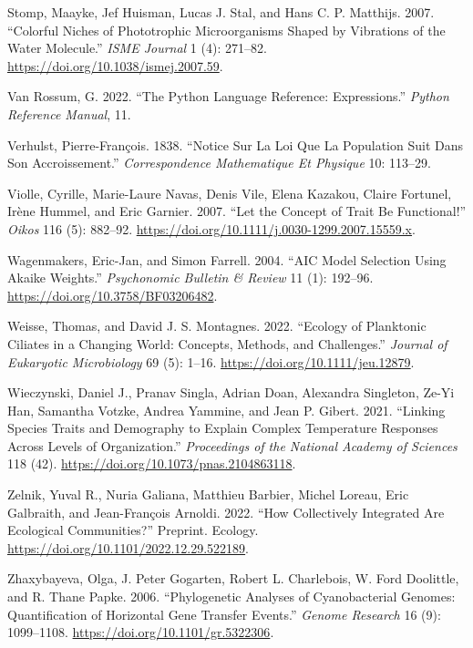 \documentclass[
  letterpaper,
  DIV=11,
  numbers=noendperiod]{scrartcl}
\newlength{\cslhangindent}
\newenvironment{CSLReferences}[2] %
 {\begin{list}{}{%
  \setlength{\itemindent}{0pt}
  \setlength{\leftmargin}{0pt}
  \setlength{\parsep}{0pt}
  \ifodd #1
   \setlength{\leftmargin}{\cslhangindent}
   \setlength{\itemindent}{-1\cslhangindent}
  \fi
  \setlength{\itemsep}{#2\baselineskip}}}
 {\end{list}}
\begin{document}
\begin{CSLReferences}{1}{0}
Stomp, Maayke, Jef Huisman, Lucas J. Stal, and Hans C. P. Matthijs.
2007. {``Colorful Niches of Phototrophic Microorganisms Shaped by
Vibrations of the Water Molecule.''} \emph{ISME Journal} 1 (4): 271--82.
\url{https://doi.org/10.1038/ismej.2007.59}.

Van Rossum, G. 2022. {``The Python Language Reference: {Expressions}.''}
\emph{Python Reference Manual}, 11.

Verhulst, Pierre-François. 1838. {``Notice Sur La Loi Que La Population
Suit Dans Son Accroissement.''} \emph{Correspondence Mathematique Et
Physique} 10: 113--29.

Violle, Cyrille, Marie-Laure Navas, Denis Vile, Elena Kazakou, Claire
Fortunel, Irène Hummel, and Eric Garnier. 2007. {``Let the Concept of
Trait Be Functional!''} \emph{Oikos} 116 (5): 882--92.
\url{https://doi.org/10.1111/j.0030-1299.2007.15559.x}.

Wagenmakers, Eric-Jan, and Simon Farrell. 2004. {``{AIC} Model Selection
Using {Akaike} Weights.''} \emph{Psychonomic Bulletin \& Review} 11 (1):
192--96. \url{https://doi.org/10.3758/BF03206482}.

Weisse, Thomas, and David J. S. Montagnes. 2022. {``Ecology of
Planktonic Ciliates in a Changing World: {Concepts}, Methods, and
Challenges.''} \emph{Journal of Eukaryotic Microbiology} 69 (5): 1--16.
\url{https://doi.org/10.1111/jeu.12879}.

Wieczynski, Daniel J., Pranav Singla, Adrian Doan, Alexandra Singleton,
Ze-Yi Han, Samantha Votzke, Andrea Yammine, and Jean P. Gibert. 2021.
{``Linking Species Traits and Demography to Explain Complex Temperature
Responses Across Levels of Organization.''} \emph{Proceedings of the
National Academy of Sciences} 118 (42).
\url{https://doi.org/10.1073/pnas.2104863118}.

Zelnik, Yuval R., Nuria Galiana, Matthieu Barbier, Michel Loreau, Eric
Galbraith, and Jean-François Arnoldi. 2022. {``How Collectively
Integrated Are Ecological Communities?''} Preprint. {Ecology}.
\url{https://doi.org/10.1101/2022.12.29.522189}.

Zhaxybayeva, Olga, J. Peter Gogarten, Robert L. Charlebois, W. Ford
Doolittle, and R. Thane Papke. 2006. {``Phylogenetic Analyses of
Cyanobacterial Genomes: {Quantification} of Horizontal Gene Transfer
Events.''} \emph{Genome Research} 16 (9): 1099--1108.
\url{https://doi.org/10.1101/gr.5322306}.

\end{CSLReferences}
\end{document}
